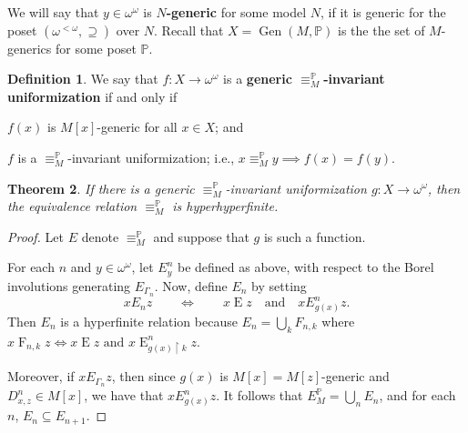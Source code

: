 \documentclass{amsart}
\newcommand{\Gen}{\operatorname{Gen}}
\newenvironment{enumerate-(i)}{\begin{enumerate}[label={\upshape (\roman*)}, leftmargin=2pc]}{\end{enumerate}}
\newtheorem{theorem}{Theorem}[section]
\theoremstyle{definition}
\newtheorem{definition}[theorem]{Definition}
\theoremstyle{remark}
\begin{document}
We will say that $y\in\omega^\omega$ is \textbf{\(N\)-generic} for some model \(N\), if it is generic for the poset $(\omega^{<\omega},\supseteq)$ over \(N\).
Recall that $X=\Gen(M,\mathbb{P})$ is the the set of $M$-generics for some poset $\mathbb{P}$.

\begin{definition}
     We say that $f\colon X\to\omega^\omega$ is a {\bf generic  \(\equiv^\mathbb{P}_M\)-invariant uniformization} if and only if
     \begin{enumerate-(i)}
    \item 
    $f(x)$ is $M[x]$-generic for all \(x\in X\); and 
    \item
    \(f\) is a \(\equiv^\mathbb{P}_M\)-invariant uniformization; i.e., \(x\equiv^\mathbb{P}_My\implies f(x)=f(y)\).
     \end{enumerate-(i)}
\end{definition}
 




\begin{theorem}
\label{thm : invariant function}
If there is a generic \(\equiv^\mathbb{P}_M\)-invariant uniformization \(g\colon X\to\omega^\omega\), then the equivalence relation $\equiv ^\mathbb{P}_M$ is hyperhyperfinite.
\end{theorem}
\begin{proof}
Let \(E\) denote \( \equiv ^\mathbb{P}_M\) and  suppose that $g$ is such a function. 


For each $n$ and $y\in\omega^\omega$, let $E^n_y$ be defined as above, with respect to the Borel involutions generating $E_{\Gamma_n}$.  Now, define $E_n$ by setting \[x\mathbin{E_n}z\qquad\iff\qquad x\mathbin{E}z\quad\text{and}\quad xE^n_{g(x)} z.\] Then $E_n$ is a hyperfinite relation because \(E_n= \bigcup_k F_{n,k}\) where \(x\mathbin{F}_{n,k} z \iff x\mathbin{E} z \text{ and } x\mathbin{E}^n_{g(x)\restriction k}z\).

Moreover, if  $x\mathbin{E_{\Gamma_n}}z$, then since $g(x)$ is $M[x]=M[z]$-generic and $D^n_{x,z}\in M[x]$, we have that $x\mathbin{E^n_{g(x)}}z $. It follows that $E^\mathbb{P}_M=\bigcup_n E_n$, and for each $n$, $E_n\subseteq E_{n+1}$. 
\end{proof}
\end{document}
